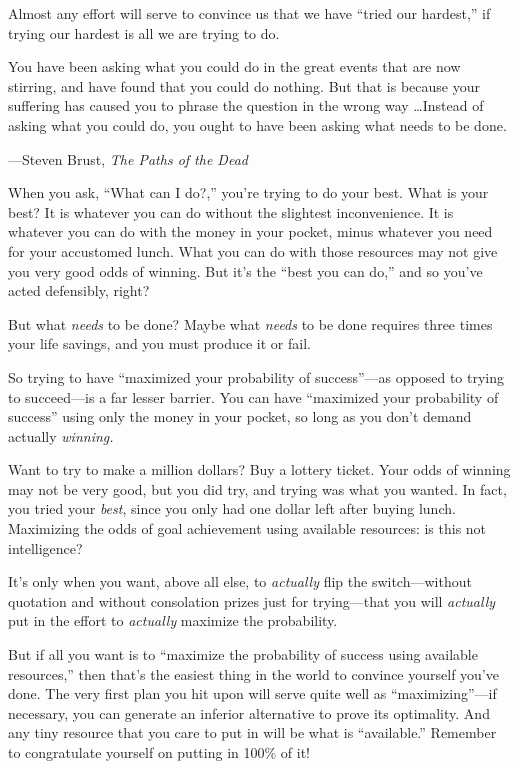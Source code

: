 {
 Almost any effort will serve to convince us that we have
``tried our hardest,'' if trying our
hardest is all we are trying to do.}

{
 You have been asking what you could do in the great events that
are now stirring, and have found that you could do nothing. But that is
because your suffering has caused you to phrase the question in the
wrong way \ldots Instead of asking what you could do, you ought to have
been asking what needs to be done.}

{\raggedleft
 {}---Steven Brust, \textit{The Paths of the
Dead}
\par}


\bigskip

{
 When you ask, ``What can I
do?,'' you're trying to do your best.
What is your best? It is whatever you can do without the slightest
inconvenience. It is whatever you can do with the money in your pocket,
minus whatever you need for your accustomed lunch. What you can do with
those resources may not give you very good odds of winning. But
it's the ``best you can
do,'' and so you've acted defensibly,
right?}

{
 But what \textit{needs} to be done? Maybe what \textit{needs} to
be done requires three times your life savings, and you must produce it
or fail.}

{
 So trying to have ``maximized your probability of
success''---as opposed to trying to succeed---is a
far lesser barrier. You can have ``maximized your
probability of success'' using only the money in your
pocket, so long as you don't demand actually
\textit{winning.}}

{
 Want to try to make a million dollars? Buy a lottery ticket. Your
odds of winning may not be very good, but you did try, and trying was
what you wanted. In fact, you tried your \textit{best}, since you only
had one dollar left after buying lunch. Maximizing the odds of goal
achievement using available resources: is this not intelligence?}

{
 It's only when you want, above all else, to
\textit{actually} flip the switch---without quotation and without
consolation prizes just for trying---that you will \textit{actually}
put in the effort to \textit{actually} maximize the probability.}

{
 But if all you want is to ``maximize the
probability of success using available resources,''
then that's the easiest thing in the world to convince
yourself you've done. The very first plan you hit upon
will serve quite well as
``maximizing''---if necessary, you
can generate an inferior alternative to prove its optimality. And any
tiny resource that you care to put in will be what is
``available.'' Remember to
congratulate yourself on putting in 100\% of it!}

